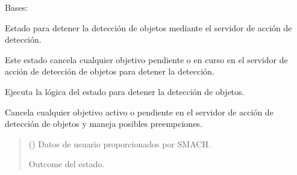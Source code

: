 \documentclass[a4paper,10pt,spanish]{sphinxmanual}
\begin{document}

\begin{fulllineitems}
\label{\detokenize{squad_approach_control_action:squad_approach_control_action.StopObjectDetectionState}}
\pysigstartsignatures
{}
\pysigstopsignatures
\sphinxAtStartPar
Bases: 

\sphinxAtStartPar
Estado para detener la detección de objetos mediante el servidor de acción de detección.

\sphinxAtStartPar
Este estado cancela cualquier objetivo pendiente o en curso en el servidor de acción
de detección de objetos para detener la detección.

\begin{fulllineitems}
\label{\detokenize{squad_approach_control_action:squad_approach_control_action.StopObjectDetectionState.execute}}
\pysigstartsignatures
{}
\pysigstopsignatures
\sphinxAtStartPar
Ejecuta la lógica del estado para detener la detección de objetos.

\sphinxAtStartPar
Cancela cualquier objetivo activo o pendiente en el servidor de acción de detección
de objetos y maneja posibles preempciones.
\begin{quote}\begin{description}
\sphinxAtStartPar
{} () \textendash{} Datos de usuario proporcionados por SMACH.

\sphinxAtStartPar
Outcome del estado.

\sphinxAtStartPar
{}

\end{description}\end{quote}

\end{fulllineitems}


\end{fulllineitems}
\end{document}
